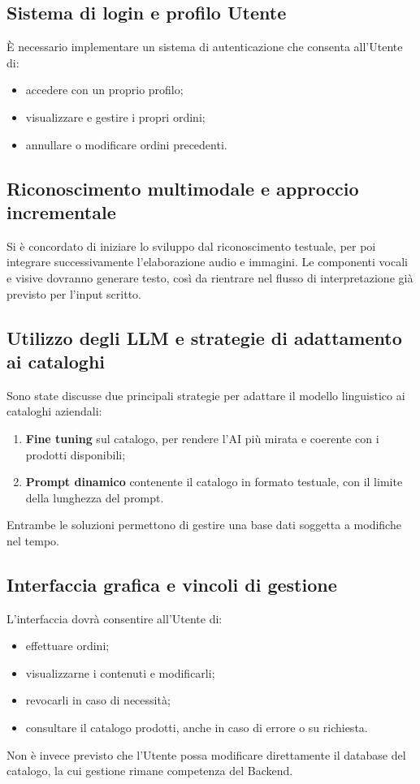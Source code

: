 \documentclass[a4paper,12pt]{article}
\begin{document}
\subsection{Sistema di login e profilo \texorpdfstring{Utente}{Utente}}
È necessario implementare un sistema di autenticazione che consenta all’Utente di:
\begin{itemize}
    \item accedere con un proprio profilo;
    \item visualizzare e gestire i propri ordini;
    \item annullare o modificare ordini precedenti.
\end{itemize}

\subsection{Riconoscimento multimodale e approccio incrementale}
Si è concordato di iniziare lo sviluppo dal riconoscimento testuale, per poi integrare successivamente l’elaborazione audio e immagini.  
Le componenti vocali e visive dovranno generare testo, così da rientrare nel flusso di interpretazione già previsto per l’input scritto.

\subsection{Utilizzo degli LLM e strategie di adattamento ai cataloghi}
Sono state discusse due principali strategie per adattare il modello linguistico ai cataloghi aziendali:
\begin{enumerate}
    \item \textbf{Fine tuning} sul catalogo, per rendere l’AI più mirata e coerente con i prodotti disponibili;
    \item \textbf{Prompt dinamico} contenente il catalogo in formato testuale, con il limite della lunghezza del prompt.
\end{enumerate}
Entrambe le soluzioni permettono di gestire una base dati soggetta a modifiche nel tempo.

\subsection{Interfaccia grafica e vincoli di gestione}
L’interfaccia dovrà consentire all’Utente di:
\begin{itemize}
    \item effettuare ordini;
    \item visualizzarne i contenuti e modificarli;
    \item revocarli in caso di necessità;
    \item consultare il catalogo prodotti, anche in caso di errore o su richiesta.
\end{itemize}
Non è invece previsto che l’Utente possa modificare direttamente il database del catalogo, la cui gestione rimane competenza del Backend.
\end{document}
